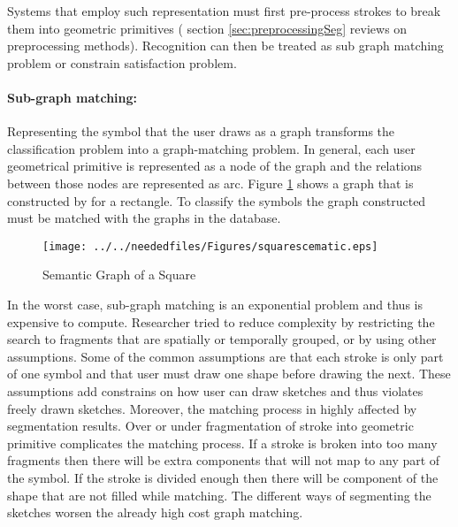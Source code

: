  Systems that employ such representation must first pre-process strokes to break them into geometric primitives ( section \ref{sec:preprocessingSeg} reviews on preprocessing methods). Recognition can then be treated as sub graph matching problem or constrain satisfaction problem.   
 
\paragraph{Sub-graph matching:}
\label{sec:GraphSearching}

Representing the symbol that the user draws as a graph transforms the classification problem into a graph-matching problem. In general, each user geometrical primitive is represented as a node of the graph and the relations between those nodes are represented as arc. Figure \ref{fig:squarescematic} shows a graph that is constructed by \cite{mulitstroke5} for a rectangle. To classify the symbols the graph constructed must be matched with the graphs in the database. 

\begin{figure}
	\centering
		\texttt{[image: ../../neededfiles/Figures/squarescematic.eps]}
	\caption[Semantic Graph of a Square ]{Semantic Graph of a Square \cite{mulitstroke5}}
	\label{fig:squarescematic}
\end{figure}


In the worst case, sub-graph matching is an exponential problem and thus is expensive to compute. Researcher tried to reduce complexity by restricting the search to fragments that are spatially or temporally grouped, or by using other assumptions. Some of the common assumptions are that each stroke is only part of one symbol and that user must draw one shape before drawing the next\cite{physicalmeaning6}. These assumptions add constrains on how user can draw sketches and thus violates freely drawn sketches.  Moreover, the matching process in highly affected by segmentation results. Over or under fragmentation of stroke into geometric primitive complicates the matching process.  If a stroke is broken into too many fragments then there will be extra components that will not map to any part of the symbol. If the stroke is divided enough then there will be component of the shape that are not filled while matching. The different ways of segmenting the sketches worsen the already high cost graph matching. 


